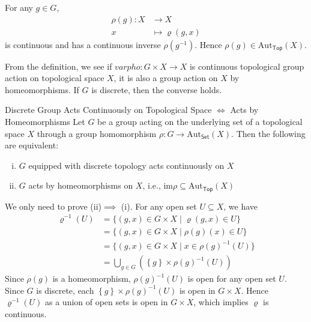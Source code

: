 \documentclass{report}
\begin{document}
\begin{prf}
	For any $g\in G$,
	\begin{align*}
		\rho(g): X & \longrightarrow X        \\
		x          & \longmapsto \varrho(g,x)
	\end{align*}
	is continuous and has a continuous inverse $\rho(g^{-1})$. Hence $\rho(g)\in \mathrm{Aut}_{\mathsf{Top}}(X)$.
\end{prf}

From the definition, we see if $varpho:G\times X\to X$ is continuous topological group action on topological space $X$, it is also a group action on $X$ by homeomorphisms. If $G$ is discrete, then the converse holds.

\begin{proposition}{Discrete Group Acts Continuously on Topological Space $\iff$ Acts by Homeomorphisms}{}
	Let $G$ be a group acting on the underlying set of a topological space $X$ through a group homomorphism $\rho:G\to \mathrm{Aut}_{\mathsf{Set}}(X)$. Then the following are equivalent:
	\begin{enumerate}[(i)]
		\item $G$ equipped with discrete topology acts continuously on $X$
		\item $G$ acts by homeomorphisms on $X$, i.e.,
		      $\mathrm{im}\rho \subseteq \mathrm{Aut}_{\mathsf{Top}}(X)$
	\end{enumerate}
\end{proposition}
\begin{prf}
	We only need to prove (ii)$\implies$ (i). For any open set $U\subseteq X$, we have
	\begin{align*}
		\varrho^{-1}(U) & =\{(g,x)\in G\times X\mid \varrho(g,x)\in U\}                         \\
		                & =\{(g,x)\in G\times X\mid \rho(g)(x)\in U\}                           \\
		                & =\{(g,x)\in G\times X\mid x\in \rho(g)^{-1}(U)\}                      \\
		                & =\bigcup_{g\in G}\left(\left\{g\right\}\times \rho(g)^{-1}(U) \right)
	\end{align*}
	Since $\rho(g)$ is a homeomorphism, $\rho(g)^{-1}(U)$ is open for any open set $U$. Since $G$ is discrete,  each $\left\{g\right\}\times \rho(g)^{-1}(U)$ is open in $G\times X$. Hence $\varrho^{-1}(U)$ as a union of open sets is open in $G\times X$, which implies $\varrho$ is continuous.
\end{prf}
\end{document}
